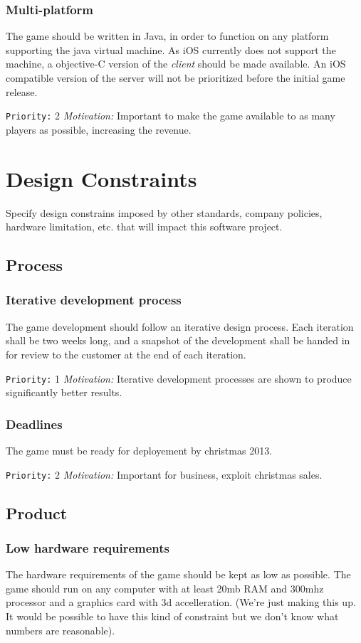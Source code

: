 \documentclass[a4paper,10pt]{article}
\newcommand{\prio}[2]{\texttt{Priority:} #1 \emph{Motivation:} #2}
\begin{document}
\subsubsection{Multi-platform}
The game should be written in Java, in order to function on any platform supporting the java virtual machine. As iOS currently does not support the machine, a objective-C version of the \emph{client} should be made available. An iOS compatible version of the server will not be prioritized before the initial game release.

\prio{2}{Important to make the game available to as many players as possible, increasing the revenue.}

\section{Design Constraints}
Specify design constrains imposed by other standards, company policies, hardware limitation, etc. that will impact this software project.

\subsection{Process}
\subsubsection{Iterative development process}
The game development should follow an iterative design process. Each iteration shall be two weeks long, and a snapshot of the development shall be handed in for review to the customer at the end of each iteration.

\prio{1}{Iterative development processes are shown to produce significantly better results.}


\subsubsection{Deadlines}
The game must be ready for deployement by christmas 2013.

\prio{2}{Important for business, exploit christmas sales.}


\subsection{Product}
\subsubsection{Low hardware requirements}
\label{hwreq}
The hardware requirements of the game should be kept as low as possible. The game should run on any computer with at least 20mb RAM and 300mhz processor and a graphics card with 3d accelleration. (We're just making this up. It would be possible to have this kind of constraint but we don't know what numbers are reasonable).
\end{document}
